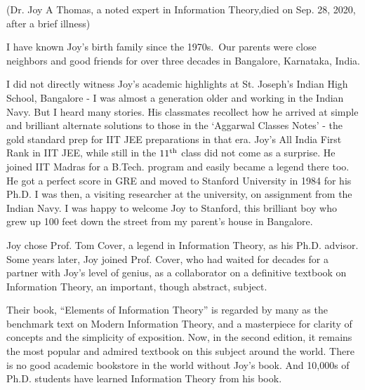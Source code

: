 \begin{center}
\vspace{-.8cm}
(Dr. Joy A Thomas, a noted expert in Information Theory,\break died on Sep. 28, 2020, after a brief illness)
\end{center}

\begin{multicols}{2}

I have known Joy’s birth family since the 1970s.~Our parents were close neighbors and good friends for over three decades in Bangalore, Karnataka, India.

\vspace{-.1cm}

I did not directly witness Joy’s academic highlights at St. Joseph’s Indian High School, Bangalore - I was almost a generation older and working in the Indian Navy. But I heard many stories.  His classmates recollect how he arrived at simple and brilliant alternate solutions to those in the ‘Aggarwal Classes Notes’ - the gold standard prep for IIT JEE preparations in that era. Joy’s All India First Rank in IIT JEE, while still in the $11^{\rm th}$ class did not come as a surprise. He joined IIT Madras for a B.Tech. program and easily became a legend there too. He got a perfect score in GRE and moved to Stanford University in 1984 for his Ph.D. I was then, a visiting researcher at the university, on assignment from the Indian Navy. I was happy to welcome Joy to Stanford, this brilliant boy who grew up 100 feet down the street from my parent’s house in Bangalore.

\vspace{-.1cm}

Joy chose Prof. Tom Cover, a legend in Information Theory, as his Ph.D. advisor. Some years later, Joy joined Prof. Cover, who had waited for decades for a partner with Joy’s level of genius, as a collaborator on a definitive textbook on Information Theory, an important, though abstract, subject.

\vspace{-.1cm}

Their book, “Elements of Information Theory” is regarded by many as the benchmark text on Modern Information Theory, and a masterpiece for clarity of concepts and the simplicity of exposition. Now, in the second edition, it remains the most popular and admired textbook on this subject around the world. There is no good academic bookstore in the world without Joy’s book. And 10,000s of Ph.D. students have learned Information Theory from his book.


\end{multicols}
